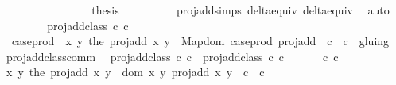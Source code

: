 \begin{isabellebody}
\ \ \isamarkupfalse%
\isanewline
\ \ \ \ \isamarkupfalse%
\ {}\isanewline
\ \ \ \ \isamarkupfalse%
\ \isamarkupfalse%
\ {\isacharquery}thesis\ \isanewline
\ \ \ \ \ \ \isamarkupfalse%
\ {\isachardoublequoteopen}{}{\isachardoublequoteclose}\ proj{\isacharunderscore}add{\isachardot}simps\ delta{\isacharunderscore}equiv{\isacharparenleft}{}{\isacharparenright}\ delta{\isacharunderscore}equiv{\isacharparenleft}{}{\isacharparenright}\ \isamarkupfalse%
\ auto\isanewline
\ \ \isamarkupfalse%
\ \ \ \ \isanewline
{}\isamarkupfalse%
%
\endisatagproof
{\isafoldproof}%
%
\isadelimproof
\isanewline
%
\endisadelimproof
\isanewline
\isanewline
{}\isamarkupfalse%
\ {\isachardoublequoteopen}proj{\isacharunderscore}add{\isacharunderscore}class\ c{}\ c{}\ {\isacharequal}\isanewline
\ \ {\isacharparenleft}{\isacharparenleft}{\isacharparenleft}case{\isacharunderscore}prod\ {\isacharparenleft}{\isasymlambda}\ x\ y{\isachardot}\ the\ {\isacharparenleft}proj{\isacharunderscore}add\ x\ y{\isacharparenright}{\isacharparenright}{\isacharparenright}\ {\isacharbackquote}\ {\isacharparenleft}Map{\isachardot}dom\ {\isacharparenleft}case{\isacharunderscore}prod\ proj{\isacharunderscore}add{\isacharparenright}\ {\isasyminter}\ {\isacharparenleft}c{}\ {\isasymtimes}\ c{}{\isacharparenright}{\isacharparenright}{\isacharparenright}\ {\isacharslash}{\isacharslash}\ gluing{\isacharparenright}{\isachardoublequoteclose}\isanewline
\isanewline
{}\isamarkupfalse%
\ proj{\isacharunderscore}add{\isacharunderscore}class{\isacharunderscore}comm{\isacharcolon}\isanewline
\ \ {\isachardoublequoteopen}proj{\isacharunderscore}add{\isacharunderscore}class\ c{}\ c{}\ {\isacharequal}\ proj{\isacharunderscore}add{\isacharunderscore}class\ c{}\ c{}{\isachardoublequoteclose}\isanewline
%
\isadelimproof
%
\endisadelimproof
%
\isatagproof
{}\isamarkupfalse%
\ {\isacharminus}\ \isanewline
\ \ \isacommand{{\isacharbraceleft}}\isamarkupfalse%
\isamarkupfalse%
\ c{}\ c{}\isanewline
\ \ \isamarkupfalse%
\ {\isachardoublequoteopen}{\isacharparenleft}{\isasymlambda}{\isacharparenleft}x{\isacharcomma}\ y{\isacharparenright}{\isachardot}\ the\ {\isacharparenleft}proj{\isacharunderscore}add\ x\ y{\isacharparenright}{\isacharparenright}\ {\isacharbackquote}\ {\isacharparenleft}dom\ {\isacharparenleft}{\isasymlambda}{\isacharparenleft}x{\isacharcomma}\ y{\isacharparenright}{\isachardot}\ proj{\isacharunderscore}add\ x\ y{\isacharparenright}\ {\isasyminter}\ c{}\ {\isasymtimes}\ c{}{\isacharparenright}\isanewline

\end{isabellebody}
